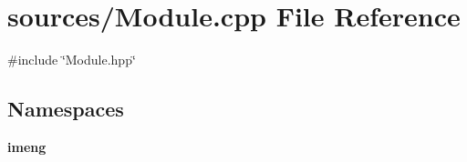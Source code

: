 \section{sources/\+Module.cpp File Reference}
\label{_module_8cpp}
{\ttfamily \#include \char`\"{}Module.\+hpp\char`\"{}}\newline
\subsection*{Namespaces}
\begin{DoxyCompactItemize}
\item 
 \textbf{ imeng}
\end{DoxyCompactItemize}
